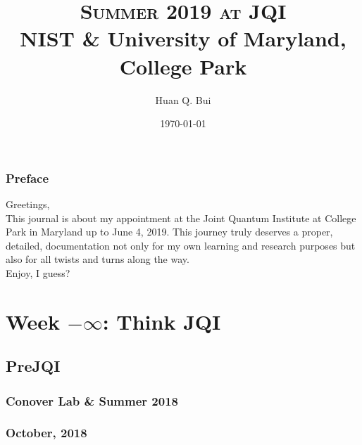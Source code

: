 \documentclass{report}
\theoremstyle{definition}
\begin{document}
	\begin{titlepage}\centering
		\clearpage
		\title{\textsc{\bf{Summer 2019 at JQI}}\\\smallskip NIST \& University of Maryland, College Park\\}
		\author{\bigskip Huan Q. Bui}
		\date{\today}
		\maketitle
		\thispagestyle{empty}
	\end{titlepage}

\newpage

\subsection*{Preface}

Greetings,\\

This journal is about my appointment at the Joint Quantum Institute at College Park in Maryland up to June 4, 2019. This journey truly deserves a proper, detailed, documentation not only for my own learning and research purposes but also for all twists and turns along the way.  \\

Enjoy, I guess?


\newpage
\tableofcontents
\newpage

\chapter{Week $-\infty$: Think JQI}

\section{Pre\textendash JQI}

\subsection{Conover Lab \& Summer 2018}

\subsection{October, 2018}
\end{document}
